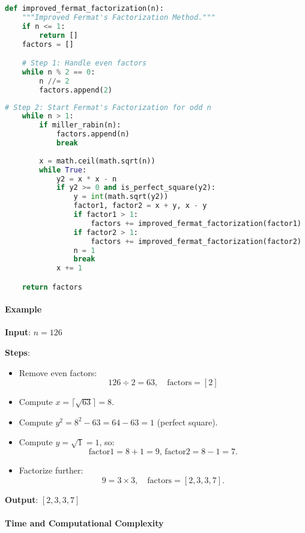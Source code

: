 \documentclass[12pt]{report}
\begin{document}
\begin{lstlisting}[language=Python]
def improved_fermat_factorization(n):
    """Improved Fermat's Factorization Method."""
    if n <= 1:
        return []
    factors = []

    # Step 1: Handle even factors
    while n % 2 == 0:
        n //= 2
        factors.append(2)
\end{lstlisting}

\clearpage
        
\begin{lstlisting}[language=Python]
    # Step 2: Start Fermat's Factorization for odd n
    while n > 1:
        if miller_rabin(n):
            factors.append(n)
            break
        
        x = math.ceil(math.sqrt(n))
        while True:
            y2 = x * x - n
            if y2 >= 0 and is_perfect_square(y2):
                y = int(math.sqrt(y2))
                factor1, factor2 = x + y, x - y
                if factor1 > 1:
                    factors += improved_fermat_factorization(factor1)
                if factor2 > 1:
                    factors += improved_fermat_factorization(factor2)
                n = 1
                break
            x += 1

    return factors
\end{lstlisting}

\paragraph{Example}

\textbf{Input}: $n = 126$  

\textbf{Steps}:  
\begin{itemize}
    \item Remove even factors:
\[
    126 \div 2 = 63, \quad \text{factors} = [2]
\]
    \item Compute $x = \lceil \sqrt{63} \rceil = 8$.
    \item Compute $y^2 = 8^2 - 63 = 64 - 63 = 1$ (perfect square).
    \item Compute $y = \sqrt{1} = 1$, so:
\[
    \text{factor1} = 8 + 1 = 9, \, \text{factor2} = 8 - 1 = 7.
\]
    \item Factorize further:
\[
    9 = 3 \times 3, \quad \text{factors} = [2, 3, 3, 7].
\]
\end{itemize}

\textbf{Output}: $[2, 3, 3, 7]$  

\paragraph{Time and Computational Complexity}
\end{document}
